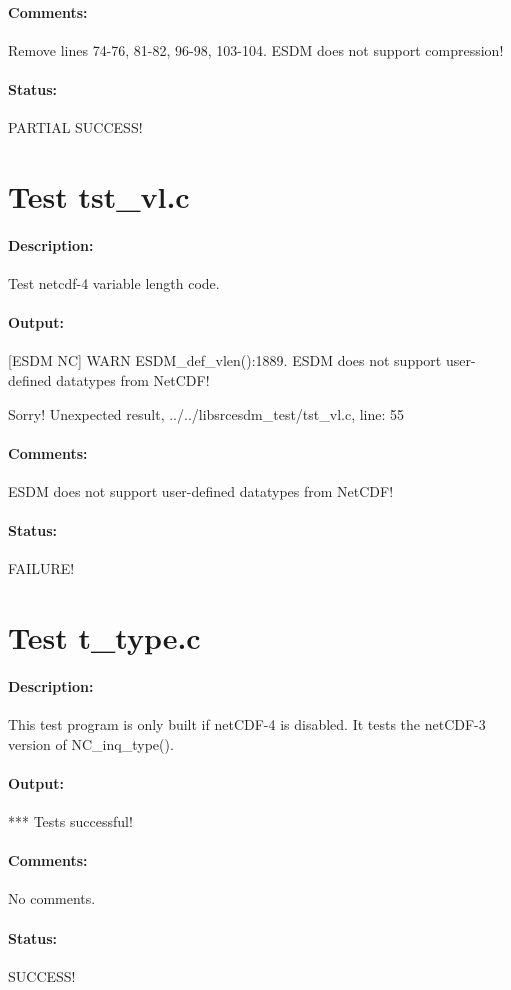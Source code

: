 \paragraph{Comments:} Remove lines 74-76, 81-82, 96-98, 103-104. ESDM does not support compression!

\paragraph{Status:} PARTIAL SUCCESS!

\section{Test tst\_vl.c}

\paragraph{Description:} Test netcdf-4 variable length code.

\paragraph{Output:} [ESDM NC] WARN ESDM\_def\_vlen():1889. ESDM does not support user-defined datatypes from NetCDF!

Sorry! Unexpected result, ../../libsrcesdm\_test/tst\_vl.c, line: 55

\paragraph{Comments:} ESDM does not support user-defined datatypes from NetCDF!

\paragraph{Status:} FAILURE!

\section{Test t\_type.c}

\paragraph{Description:} This test program is only built if netCDF-4 is disabled. It tests
   the netCDF-3 version of NC\_inq\_type().

\paragraph{Output:} *** Tests successful!

\paragraph{Comments:} No comments.

\paragraph{Status:} SUCCESS!
